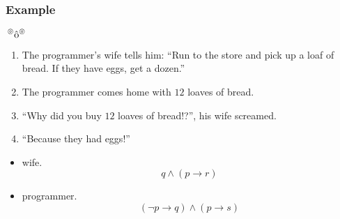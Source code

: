 \documentclass[UTF8,11pt,colorlinks,compress,openany]{beamer}%
\begin{document}
\begin{frame}\frametitle{Example}
	\begin{block}{$\sideset{^\circledcirc}{^\circledcirc}{\operatorname{\hat{o}}}$}
		\begin{enumerate}
			\item The programmer's wife tells him: ``Run to the store and pick up a loaf of bread. If they have eggs, get a dozen.''
			\item The programmer comes home with $12$ loaves of bread.
			\item ``Why did you buy $12$ loaves of bread!?'', his wife screamed.
			\item ``Because they had eggs!''
		\end{enumerate}	
	\end{block}
	\begin{itemize}
		\item wife.
		\[q\wedge(p\to r)\]
		\item programmer.
		\[(\neg p\to q)\wedge(p\to s)\]
	\end{itemize}
\end{frame}
\end{document}
